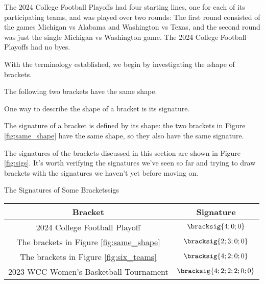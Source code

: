 {The 2024 College Football Playoffs had four starting lines, one for each of its participating teams, and was played over two rounds: The first round consisted of the games Michigan vs Alabama and Washington vs Texas, and the second round was just the single Michigan vs Washington game. The 2024 College Football Playoffs had no byes.

With the terminology established, we begin by investigating the \i{shape} of brackets.


The following two brackets have the same shape.


One way to describe the shape of a bracket is its signature.


The signature of a bracket is defined by its shape: the two brackets in Figure \ref{fig:same_shape} have the same shape, so they also have the same signature.

The signatures of the brackets discussed in this section are shown in Figure \ref{fig:sigs}. It's worth verifying the signatures we've seen so far and trying to draw brackets with the signatures we haven't yet before moving on.

\begin{figg}{The Signatures of Some Brackets}{sigs}
    \begin{center}
        \begin{tabular}{ c | c }
            Bracket & Signature \\
            \hline
            2024 College Football Playoff & $\bracksig{4; 0; 0}$ \\
            The brackets in Figure \ref{fig:same_shape} & $\bracksig{2; 3; 0; 0}$\\
            The brackets in Figure \ref{fig:six_teams} & $\bracksig{4; 2; 0; 0}$\\
            2023 WCC Women's Basketball Tournament & $\bracksig{4;2;2;2;0;0}$ \\
        \end{tabular}
    \end{center}
\end{figg}

}
